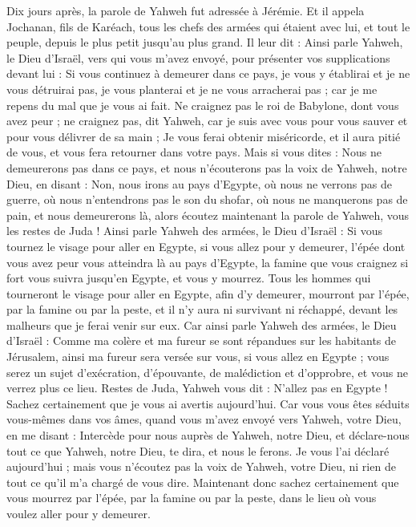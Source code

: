 \begin{multicols}{2}
Dix jours après, la parole de Yahweh fut adressée à Jérémie.
Et il appela Jochanan, fils de Karéach, tous les chefs des armées qui étaient avec lui, et tout le peuple, depuis le plus petit jusqu'au plus grand.
Il leur dit : Ainsi parle Yahweh, le Dieu d'Israël, vers qui vous m'avez envoyé, pour présenter vos supplications devant lui :
Si vous continuez à demeurer dans ce pays, je vous y établirai et je ne vous détruirai pas, je vous planterai et je ne vous arracherai pas ; car je me repens du mal que je vous ai fait.
Ne craignez pas le roi de Babylone, dont vous avez peur ; ne craignez pas, dit Yahweh, car je suis avec vous pour vous sauver et pour vous délivrer de sa main ;
Je vous ferai obtenir miséricorde, et il aura pitié de vous, et vous fera retourner dans votre pays.
Mais si vous dites : Nous ne demeurerons pas dans ce pays, et nous n'écouterons pas la voix de Yahweh, notre Dieu,
en disant : Non, nous irons au pays d'Egypte, où nous ne verrons pas de guerre, où nous n'entendrons pas le son du shofar, où nous ne manquerons pas de pain, et nous demeurerons là,
alors écoutez maintenant la parole de Yahweh, vous les restes de Juda ! Ainsi parle Yahweh des armées, le Dieu d'Israël : Si vous tournez le visage pour aller en Egypte, si vous allez pour y demeurer,
l'épée dont vous avez peur vous atteindra là au pays d'Egypte, la famine que vous craignez si fort vous suivra jusqu'en Egypte, et vous y mourrez.
Tous les hommes qui tourneront le visage pour aller en Egypte, afin d'y demeurer, mourront par l'épée, par la famine ou par la peste, et il n'y aura ni survivant ni réchappé, devant les malheurs que je ferai venir sur eux.
Car ainsi parle Yahweh des armées, le Dieu d'Israël : Comme ma colère et ma fureur se sont répandues sur les habitants de Jérusalem, ainsi ma fureur sera versée sur vous, si vous allez en Egypte ; vous serez un sujet d'exécration, d'épouvante, de malédiction et d'opprobre, et vous ne verrez plus ce lieu.
Restes de Juda, Yahweh vous dit : N'allez pas en Egypte ! Sachez certainement que je vous ai avertis aujourd'hui.
Car vous vous êtes séduits vous-mêmes dans vos âmes, quand vous m'avez envoyé vers Yahweh, votre Dieu, en me disant : Intercède pour nous auprès de Yahweh, notre Dieu, et déclare-nous tout ce que Yahweh, notre Dieu, te dira, et nous le ferons.
Je vous l'ai déclaré aujourd'hui ; mais vous n'écoutez pas la voix de Yahweh, votre Dieu, ni rien de tout ce qu'il m'a chargé de vous dire.
Maintenant donc sachez certainement que vous mourrez par l'épée, par la famine ou par la peste, dans le lieu où vous voulez aller pour y demeurer.

\end{multicols}

